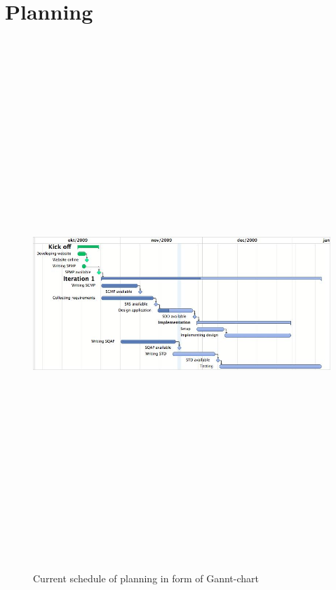 \documentclass[a4paper, 12pt]{report}
\begin{document}
			\section{Planning}	
				\label{planning}
			\begin{figure}
				\includegraphics[angle=90, height=20cm]{Gannt.jpg}
				\caption{Current schedule of planning in form of Gannt-chart}
			\end{figure}
			
			
	
\end{document}
